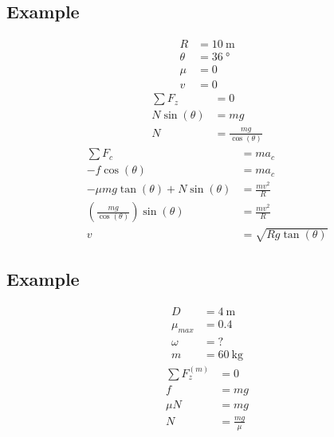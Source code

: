 \documentclass{article}
\begin{document}
\subsection{Example}

\begin{align*}
	R & = \SI{10}{\meter} \\
	\theta & = \SI{36}{\degree} \\
	\mu & = 0 \\
	v & = 0
\end{align*}
\begin{align*}
	\sum F_z & = 0 \\
	N\sin(\theta) & = mg \\
	N & = \frac{mg}{\cos(\theta)}
\end{align*}
\begin{align*}
	\sum F_c & = ma_c \\
	-f\cos(\theta) & = ma_c \\
	-\mu mg\tan(\theta) + N\sin(\theta) & = \frac{mv^2}{R} \\
	\left( \frac{mg}{\cos(\theta)} \right) \sin(\theta) & = \frac{mv^2}{R} \\
	v & = \sqrt{ Rg\tan(\theta) }
\end{align*}

\subsection{Example}

\begin{align*}
	D & = \SI{4}{\meter} \\
	\mu_{max} & = 0.4 \\
	\omega & = ? \\
	m & = \SI{60}{\kilogram}
\end{align*}
\begin{align*}
	\sum F_z^{(m)} & = 0 \\
	f & = mg \\
	\mu N & = mg \\
	N & = \frac{mg}{\mu}
\end{align*}
\end{document}

